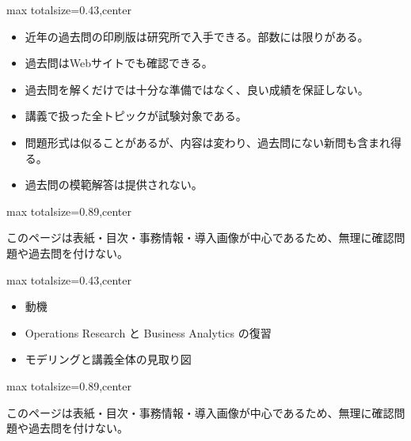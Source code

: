 \clearpage
{}
\begin{minipage}[t]{0.405\textwidth}
\begin{adjustbox}{max totalsize={\textwidth}{0.43\textheight},center}
\begin{minipage}{\textwidth}\scriptsize
{}\begin{itemize}
\item 近年の過去問の印刷版は研究所で入手できる。部数には限りがある。
\item 過去問はWebサイトでも確認できる。
\item 過去問を解くだけでは十分な準備ではなく、良い成績を保証しない。
\item 講義で扱った全トピックが試験対象である。
\item 問題形式は似ることがあるが、内容は変わり、過去問にない新問も含まれ得る。
\item 過去問の模範解答は提供されない。
\end{itemize}
\end{minipage}
\end{adjustbox}
\end{minipage}\hfill
\begin{minipage}[t]{0.58\textwidth}
\begin{adjustbox}{max totalsize={\textwidth}{0.89\textheight},center}
\begin{minipage}{\textwidth}\scriptsize
{}このページは表紙・目次・事務情報・導入画像が中心であるため、無理に確認問題や過去問を付けない。
\end{minipage}
\end{adjustbox}
\end{minipage}


\clearpage
{}
\begin{minipage}[t]{0.405\textwidth}
\begin{adjustbox}{max totalsize={\textwidth}{0.43\textheight},center}
\begin{minipage}{\textwidth}\scriptsize
{}\begin{itemize}
\item 動機
\item Operations Research と Business Analytics の復習
\item モデリングと講義全体の見取り図
\end{itemize}
\end{minipage}
\end{adjustbox}
\end{minipage}\hfill
\begin{minipage}[t]{0.58\textwidth}
\begin{adjustbox}{max totalsize={\textwidth}{0.89\textheight},center}
\begin{minipage}{\textwidth}\scriptsize
{}このページは表紙・目次・事務情報・導入画像が中心であるため、無理に確認問題や過去問を付けない。
\end{minipage}
\end{adjustbox}
\end{minipage}


